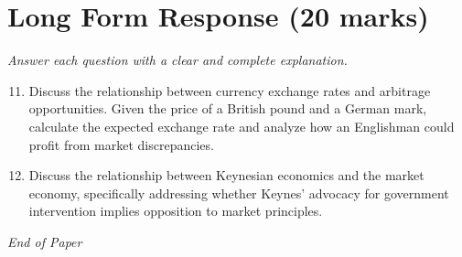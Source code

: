 \documentclass[12pt]{article}
\begin{document}
\section*{Long Form Response (20 marks)}
\textit{Answer each question with a clear and complete explanation.}
\begin{enumerate}[label=\arabic*.]
\setcounter{enumi}{10}
\item Discuss the relationship between currency exchange rates and arbitrage opportunities. Given the price of a British pound and a German mark, calculate the expected exchange rate and analyze how an Englishman could profit from market discrepancies.
\item Discuss the relationship between Keynesian economics and the market economy, specifically addressing whether Keynes' advocacy for government intervention implies opposition to market principles.
\end{enumerate}

\vfill
\noindent\textit{End of Paper}
\end{document}
